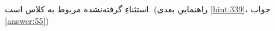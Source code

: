 \section{}
\paragraph{}\label{hint:61}
استثناءِ گرفته‌نشده مربوط به کلاس  است. (راهنماییِ بعدی \ref{hint:339}، جواب \ref{answer:55})
